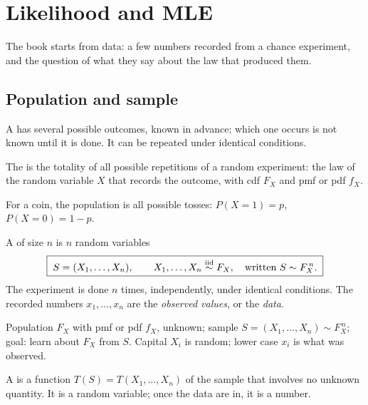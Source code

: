 \chapter{Likelihood and MLE}

The book starts from data: a few numbers recorded from a chance experiment, and the question of what they say about the law that produced them.

\section{Population and sample}

\begin{definition}
A  has several possible outcomes, known in advance; which one occurs is not known until it is done. It can be repeated under identical conditions.
\end{definition}

\begin{definition}[Population]
The  is the totality of all possible repetitions of a random experiment: the law of the random variable $X$ that records the outcome, with cdf $F_X$ and pmf or pdf $f_X$.
\end{definition}

For a coin, the population is all possible tosses: $P(X=1)=p$, $P(X=0)=1-p$.

\begin{definition}[Sample]
A  of size $n$ is $n$ random variables
\[
  \boxed{\;S=(X_1,\dots,X_n),\qquad X_1,\dots,X_n\overset{\text{iid}}{\sim} F_X,\quad\text{written } S\sim F_X^{\,n}.\;}
\]
The experiment is done $n$ times, independently, under identical conditions. The recorded numbers $x_1,\dots,x_n$ are the \emph{observed values}, or the \emph{data}.
\end{definition}

\begin{setup}
Population $F_X$ with pmf or pdf $f_X$, unknown; sample $S=(X_1,\dots,X_n)\sim F_X^{\,n}$; goal: learn about $F_X$ from $S$. Capital $X_i$ is random; lower case $x_i$ is what was observed.
\end{setup}

\begin{definition}[Statistic]
A  is a function $T(S)=T(X_1,\dots,X_n)$ of the sample that involves no unknown quantity. It is a random variable; once the data are in, it is a number.
\end{definition}

